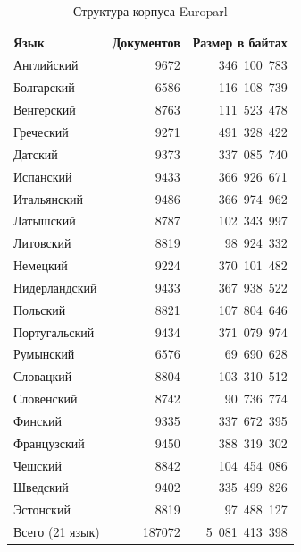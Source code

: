 \begin{table}[tbp]
    \caption{Структура корпуса Europarl}
    \begin{center}
        \begin{tabular}{lrr}
            \toprule
            \textbf{Язык} & \textbf{Документов} & \textbf{Размер в байтах} \\
            \midrule
            Английский & 9672 & 346 100 783 \\
            \midrule
            Болгарский & 6586 & 116 108 739 \\
            \midrule
            Венгерский & 8763 & 111 523 478 \\
            \midrule
            Греческий & 9271 & 491 328 422 \\
            \midrule
            Датский & 9373 & 337 085 740 \\
            \midrule
            Испанский & 9433 & 366 926 671 \\
            \midrule
            Итальянский & 9486 & 366 974 962 \\
            \midrule
            Латышский & 8787 & 102 343 997 \\
            \midrule
            Литовский & 8819 & 98 924 332 \\
            \midrule
            Немецкий & 9224 & 370 101 482 \\
            \midrule
            Нидерландский & 9433 & 367 938 522 \\
            \midrule
            Польский & 8821 & 107 804 646 \\
            \midrule
            Португальский & 9434 & 371 079 974 \\
            \midrule
            Румынский & 6576 & 69 690 628 \\
            \midrule
            Словацкий & 8804 & 103 310 512 \\
            \midrule
            Словенский & 8742 & 90 736 774 \\
            \midrule
            Финский & 9335 & 337 672 395 \\
            \midrule
            Французский & 9450 & 388 319 302 \\
            \midrule
            Чешский & 8842 & 104 454 086 \\
            \midrule
            Шведский & 9402 & 335 499 826 \\
            \midrule
            Эстонский & 8819 & 97 488 127 \\
            \midrule
            Всего (21 язык) & 187072 & 5 081 413 398 \\
            \bottomrule
        \end{tabular}\label{tab7}
    \end{center}
\end{table}

